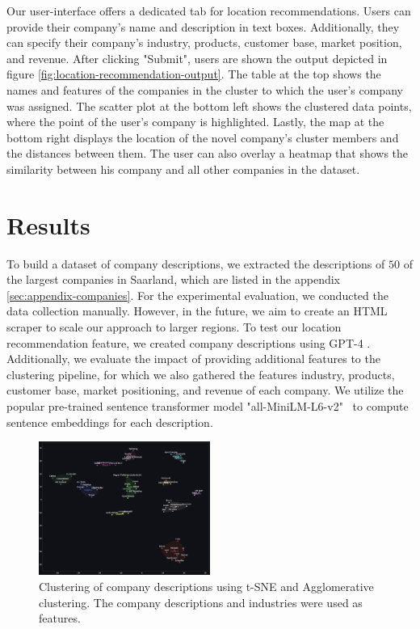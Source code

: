 \documentclass[12pt]{article}
\begin{document}
   Our user-interface offers a dedicated tab for location recommendations. Users can provide their company's name and description in text boxes. Additionally, they can specify their company's industry, products, customer base, market position, and revenue. After clicking "Submit", users are shown the output depicted in figure \ref{fig:location-recommendation-output}. The table at the top shows the names and features of the companies in the cluster to which the user's company was assigned. The scatter plot at the bottom left shows the clustered data points, where the point of the user's company is highlighted. Lastly, the map at the bottom right displays the location of the novel company's cluster members and the distances between them. The user can also overlay a heatmap that shows the similarity between his company and all other companies in the dataset.
   
   \section{Results}
   To build a dataset of company descriptions, we extracted the descriptions of $50$ of the largest companies in Saarland, which are listed in the appendix \ref{sec:appendix-companies}.
   For the experimental evaluation, we conducted the data collection manually. However, in the future, we aim to create an HTML scraper to scale our approach to larger regions. To test our location recommendation feature, we created company descriptions using GPT-4 \cite{chatgpt}.
   Additionally, we evaluate the impact of providing additional features to the clustering pipeline, for which we also gathered the features industry, products, customer base, market positioning, and revenue of each company. 
   We utilize the popular pre-trained sentence transformer model "all-MiniLM-L6-v2"~\cite{sentence-transformer-model} to compute sentence embeddings for each description.  
   
   \begin{figure}[H]
   	\centering
   	\includegraphics[width=0.5\textwidth]{figures/clustering_results.png}
   	\caption{Clustering of company descriptions using t-SNE and Agglomerative clustering. The company descriptions and industries were used as features.}
   	\label{fig:t-sne-agglomerative}
   \end{figure}
   
\end{document}
